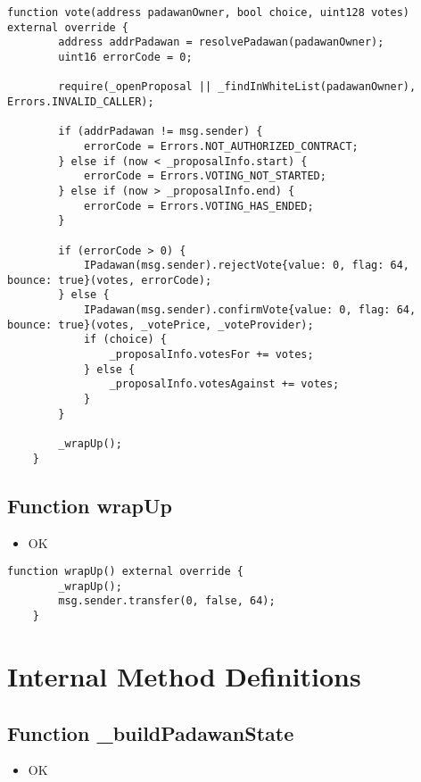 \begin{lstlisting}[firstnumber=84]
    function vote(address padawanOwner, bool choice, uint128 votes) external override {
        address addrPadawan = resolvePadawan(padawanOwner);
        uint16 errorCode = 0;

        require(_openProposal || _findInWhiteList(padawanOwner), Errors.INVALID_CALLER);

        if (addrPadawan != msg.sender) {
            errorCode = Errors.NOT_AUTHORIZED_CONTRACT;
        } else if (now < _proposalInfo.start) {
            errorCode = Errors.VOTING_NOT_STARTED;
        } else if (now > _proposalInfo.end) {
            errorCode = Errors.VOTING_HAS_ENDED;
        }

        if (errorCode > 0) {
            IPadawan(msg.sender).rejectVote{value: 0, flag: 64, bounce: true}(votes, errorCode);
        } else {
            IPadawan(msg.sender).confirmVote{value: 0, flag: 64, bounce: true}(votes, _votePrice, _voteProvider);
            if (choice) {
                _proposalInfo.votesFor += votes;
            } else {
                _proposalInfo.votesAgainst += votes;
            }
        }

        _wrapUp();
    }
\end{lstlisting}

\subsection{Function wrapUp}

\begin{itemize}
\item OK
\end{itemize}

\begin{lstlisting}[firstnumber=73]
    function wrapUp() external override {
        _wrapUp();
        msg.sender.transfer(0, false, 64);
    }
\end{lstlisting}

\section{Internal Method Definitions}


\subsection{Function \_{}buildPadawanState}

\begin{itemize}
\item OK
\end{itemize}


